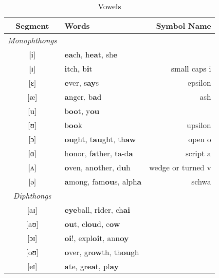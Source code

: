 \documentclass{article}
\begin{document}
  \begin{table}[tb]
    \caption{Vowels}
    \centering
    \vspace{0.5cm}
    \begin{tabular}{c | l r}
      Segment & Words & Symbol Name \\
      \hline
      \emph{Monophthongs} &                                       & \\
      {[}i{]}  & \textbf{ea}ch, h\textbf{ea}t, sh\textbf{e}       & \\
      {[}ɪ{]}  & \textbf{i}tch, b\textbf{i}t                      & small caps i \\
      {[}ɛ{]}  & \textbf{e}ver, s\textbf{ay}s                     & epsilon \\
      {[}æ{]}  & \textbf{a}nger, b\textbf{a}d                     & ash \\
      {[}u{]}  & b\textbf{oo}t, y\textbf{ou}                      & \\
      {[}ʊ{]}  & b\textbf{oo}k                                    & upsilon \\
      {[}ɔ{]}  & \textbf{ou}ght, t\textbf{au}ght, th\textbf{aw}   & open o \\
      {[}ɑ{]}  & h\textbf{o}nor, f\textbf{a}ther, ta-d\textbf{a}  & script a \\
      {[}ʌ{]}  & \textbf{o}ven, an\textbf{o}ther, d\textbf{u}h    & wedge or turned v \\
      {[}ə{]}  & \textbf{a}mong, fam\textbf{ou}s, alph\textbf{a}  & schwa \\
      \emph{Diphthongs} &                                         & \\
      {[}aɪ{]} & \textbf{eye}ball, r\textbf{i}der, ch\textbf{ai}  & \\
      {[}aʊ{]} & \textbf{ou}t, cl\textbf{ou}d, c\textbf{ow}       & \\
      {[}ɔɪ{]} & \textbf{oi}!, expl\textbf{oi}t, ann\textbf{oy}   & \\
      {[}oʊ{]} & \textbf{o}ver, gr\textbf{ow}th, th\textbf{ou}gh  & \\
      {[}eɪ{]} & \textbf{a}te, gr\textbf{ea}t, pl\textbf{ay}      &
    \end{tabular}
  \end{table}
\end{document}

